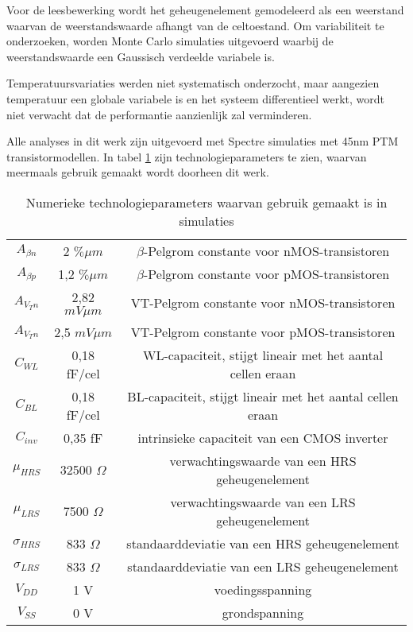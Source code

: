 Voor de leesbewerking wordt het geheugenelement gemodeleerd als een weerstand waarvan de weerstandswaarde afhangt van de celtoestand. Om variabiliteit te onderzoeken, worden Monte Carlo simulaties uitgevoerd waarbij de weerstandswaarde een Gaussisch verdeelde variabele is.

Temperatuursvariaties werden niet systematisch onderzocht, maar aangezien temperatuur een globale variabele is en het systeem differentieel werkt, wordt niet verwacht dat de performantie aanzienlijk zal verminderen.

Alle analyses in dit werk zijn uitgevoerd met Spectre simulaties met 45nm PTM transistormodellen. In tabel \ref{tab:properties} zijn technologieparameters te zien, waarvan meermaals gebruik gemaakt wordt doorheen dit werk.

\begin{table}
	\begin{tabular}{ccc}
	\hline
    $A_{\beta n}$ & 2 $\% \mu m$ & $\beta$-Pelgrom constante voor nMOS-transistoren \\
    $A_{\beta p}$ & 1,2 $\% \mu m$ & $\beta$-Pelgrom constante voor pMOS-transistoren \\
    $A_{V_{T} n}$ & 2,82 $mV \mu m$ & VT-Pelgrom constante voor nMOS-transistoren \\
    $A_{V_{T} n}$ & 2,5 $mV \mu m$ & VT-Pelgrom constante voor pMOS-transistoren \\
    $C_{WL}$ & 0,18 fF/cel & WL-capaciteit, stijgt lineair met het aantal cellen eraan \\
    $C_{BL}$ & 0,18 fF/cel & BL-capaciteit, stijgt lineair met het aantal cellen eraan \\
    $C_{inv}$ & 0,35 fF & intrinsieke capaciteit van een CMOS inverter \\
    $\mu_{HRS}$ & 32500 $\Omega$ & verwachtingswaarde van een HRS geheugenelement \\
    $\mu_{LRS}$ & 7500 $\Omega$ & verwachtingswaarde van een LRS geheugenelement \\
    $\sigma_{HRS}$ & 833 $\Omega$ & standaarddeviatie van een HRS geheugenelement \\
    $\sigma_{LRS}$ & 833 $\Omega$ & standaarddeviatie van een LRS geheugenelement \\
    $V_{DD}$ & 1 V & voedingsspanning \\
    $V_{SS}$ & 0 V & grondspanning \\
    \hline
  \end{tabular}
  \caption[Technologieparameters]{Numerieke technologieparameters waarvan gebruik gemaakt is in simulaties}
  \label{tab:properties}
\end{table}



